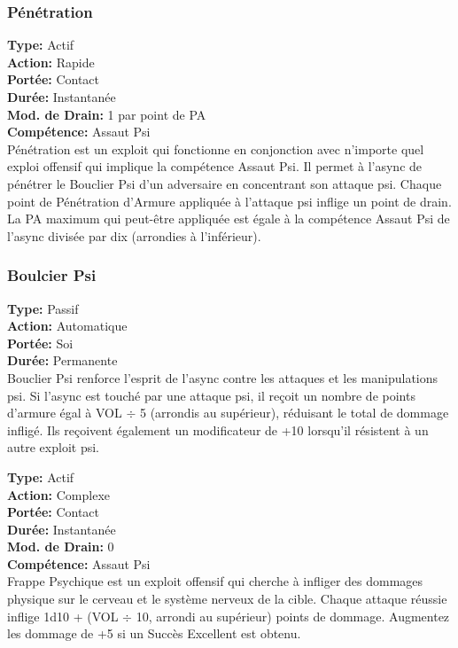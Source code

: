 \subsubsection{Pénétration} \textbf{Type:} Actif \\ \textbf{Action:} Rapide \\ \textbf{Portée:} Contact \\ \textbf{Durée:} Instantanée \\ \textbf{Mod. de Drain:} 1 par point de PA \\ \textbf{Compétence:} Assaut Psi \\ Pénétration est un exploit qui fonctionne en conjonction avec n'importe quel exploi offensif qui implique la compétence Assaut Psi. Il permet à l'async de pénétrer le Bouclier Psi d'un adversaire en concentrant son attaque psi. Chaque point de Pénétration d'Armure appliquée à l'attaque psi inflige un point de drain. La PA maximum qui peut-être appliquée est égale à la compétence Assaut Psi de l'async divisée par dix (arrondies à l'inférieur). 

\subsubsection{Boulcier Psi} \textbf{Type:} Passif \\ \textbf{Action:} Automatique \\ \textbf{Portée:} Soi \\ \textbf{Durée:} Permanente \\ Bouclier Psi renforce l'esprit de l'async contre les attaques et les manipulations psi. Si l'async est touché par une attaque psi, il reçoit un nombre de points d'armure égal à VOL  $\div$ 5 (arrondis au supérieur), réduisant le total de dommage infligé. Ils reçoivent également un modificateur de +10 lorsqu'il résistent à un autre exploit psi. 

 \textbf{Type:} Actif \\ \textbf{Action:} Complexe \\ \textbf{Portée:} Contact \\ \textbf{Durée:} Instantanée \\ \textbf{Mod. de Drain:} 0 \\ \textbf{Compétence:} Assaut Psi \\ Frappe Psychique est un exploit offensif qui cherche à infliger des dommages physique sur le cerveau et le système nerveux de la cible. Chaque attaque réussie inflige 1d10 + (VOL $\div$ 10, arrondi au supérieur) points de dommage. Augmentez les dommage de +5 si un Succès Excellent est obtenu. 

